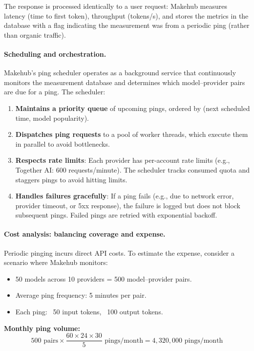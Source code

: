 \documentclass[english]{article}
\begin{document}
The response is processed identically to a user request: Makehub measures latency (time to first token), throughput (tokens/s), and stores the metrics in the database with a flag indicating the measurement was from a periodic ping (rather than organic traffic).

\paragraph{Scheduling and orchestration.}

Makehub's ping scheduler operates as a background service that continuously monitors the measurement database and determines which model–provider pairs are due for a ping. The scheduler:
\begin{enumerate}
    \item \textbf{Maintains a priority queue} of upcoming pings, ordered by (next scheduled time, model popularity).
    \item \textbf{Dispatches ping requests} to a pool of worker threads, which execute them in parallel to avoid bottlenecks.
    \item \textbf{Respects rate limits}: Each provider has per-account rate limits (e.g., Together AI: 600 requests/minute). The scheduler tracks consumed quota and staggers pings to avoid hitting limits.
    \item \textbf{Handles failures gracefully}: If a ping fails (e.g., due to network error, provider timeout, or 5xx response), the failure is logged but does not block subsequent pings. Failed pings are retried with exponential backoff.
\end{enumerate}

\paragraph{Cost analysis: balancing coverage and expense.}

Periodic pinging incurs direct API costs. To estimate the expense, consider a scenario where Makehub monitors:
\begin{itemize}
    \item 50 models across 10 providers = 500 model–provider pairs.
    \item Average ping frequency: 5 minutes per pair.
    \item Each ping: ~50 input tokens, ~100 output tokens.
\end{itemize}

\textbf{Monthly ping volume:}
\[
500 \text{ pairs} \times \frac{60 \times 24 \times 30}{5} \text{ pings/month} = 4{,}320{,}000 \text{ pings/month}
\]
\end{document}
